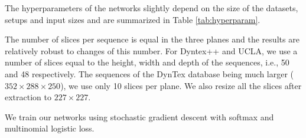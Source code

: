 \documentclass[a4paper,11pt]{article}
\begin{document}
The hyperparameters of the networks slightly depend on the size of the datasets, setups and input sizes and are summarized in Table \ref{tab:hyperparam}.
\begin{table*}[!t]
\caption{Hyperparameters used for training both T-CNNs based on AlexNet and GoogleNet on different datasets.
From left to right: initial learning rate, factor gamma by which the learning rate is multiplied at every step, weight decay, momentum, batch size, number of iterations and
steps} \label{tab:hyperparam}
\centering
{}
\end{table*}

The number of slices per sequence is equal in the three planes and the results are relatively robust to changes of this number.
For Dyntex++ and UCLA, we use a number of slices equal to the height, width and depth of the sequences, i.e., 50 and 48 respectively.
The sequences of the DynTex database being much larger ($352\times 288\times 250$), we use only 10 slices per plane.
We also resize all the slices after extraction to $227\times 227$.

We train our networks using stochastic gradient descent with softmax and multinomial logistic loss.
\end{document}

